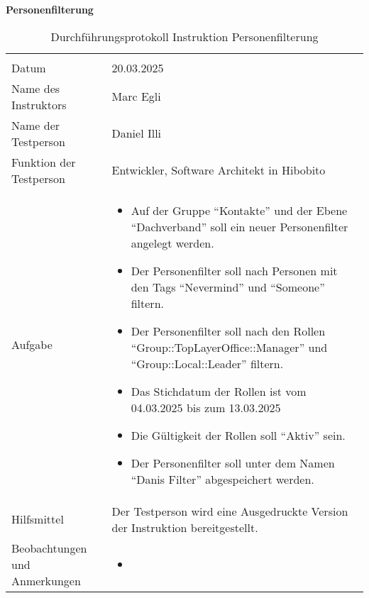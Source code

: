 \textbf{Personenfilterung}
\begin{table}[h!]
   \begin{tabular}{|L{0.4\textwidth}|L{0.6\textwidth}|}
       \hline
        \\
       Datum & 20.03.2025 \\
       \hline
       Name des Instruktors & Marc Egli \\
       \hline
       Name der Testperson & Daniel Illi \\
       \hline
       Funktion der Testperson & Entwickler, Software Architekt in Hibobito \\
       \hline
       Aufgabe & 
       \begin{itemize}
         \item Auf der Gruppe ``Kontakte'' und der Ebene ``Dachverband'' soll ein neuer Personenfilter angelegt werden.
         \item Der Personenfilter soll nach Personen mit den Tags ``Nevermind'' und ``Someone'' filtern.
         \item Der Personenfilter soll nach den Rollen ``Group::TopLayerOffice::Manager'' und ``Group::Local::Leader'' filtern.
         \item Das Stichdatum der Rollen ist vom 04.03.2025 bis zum 13.03.2025
         \item Die Gültigkeit der Rollen soll ``Aktiv'' sein.
         \item Der Personenfilter soll unter dem Namen ``Danis Filter'' abgespeichert werden.
       \end{itemize} \\
       \hline
       Hilfsmittel & Der Testperson wird eine Ausgedruckte Version der Instruktion bereitgestellt. \\
       \hline
       Beobachtungen und Anmerkungen & 
       \begin{itemize}
         \item 
       \end{itemize}   \\
       \hline
     \end{tabular}
     \caption{Durchführungsprotokoll Instruktion Personenfilterung}
\end{table}

\newpage

